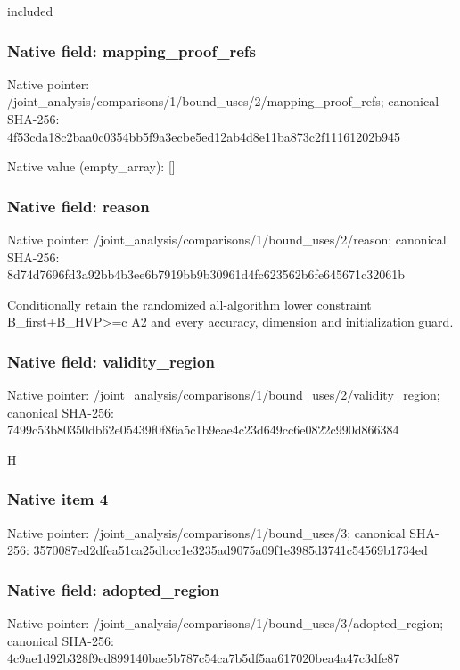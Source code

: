 \documentclass[10pt,a4paper]{article}
\begin{document}
\begingroup\raggedright\sloppy included\par\endgroup

\subsubsection{Native field: mapping\_\allowbreak{}proof\_\allowbreak{}refs}
Native pointer: /joint\_\allowbreak{}analysis/comparisons/1/bound\_\allowbreak{}uses/2/mapping\_\allowbreak{}proof\_\allowbreak{}refs; canonical SHA-256: 4f53cda18c2baa0c0354bb5f9a3ecbe5ed12ab4d8e11ba873c2f11161202b945

Native value (empty\_\allowbreak{}array): []

\subsubsection{Native field: reason}
Native pointer: /joint\_\allowbreak{}analysis/comparisons/1/bound\_\allowbreak{}uses/2/reason; canonical SHA-256: 8d74d7696fd3a92bb4b3ee6b7919bb9b30961d4fc623562b6fe645671c32061b

\begingroup\raggedright\sloppy Conditionally retain the randomized all-algorithm lower constraint B\_\allowbreak{}first+B\_\allowbreak{}HVP>=\allowbreak{}c A2 and every accuracy,\allowbreak{} dimension and initialization guard.\par\endgroup

\subsubsection{Native field: validity\_\allowbreak{}region}
Native pointer: /joint\_\allowbreak{}analysis/comparisons/1/bound\_\allowbreak{}uses/2/validity\_\allowbreak{}region; canonical SHA-256: 7499c53b80350db62e05439f0f86a5c1b9eae4c23d649cc6e0822c990d866384

\begingroup\raggedright\sloppy H\par\endgroup

\subsubsection{Native item 4}
Native pointer: /joint\_\allowbreak{}analysis/comparisons/1/bound\_\allowbreak{}uses/3; canonical SHA-256: 3570087ed2dfea51ca25dbcc1e3235ad9075a09f1e3985d3741c54569b1734ed

\subsubsection{Native field: adopted\_\allowbreak{}region}
Native pointer: /joint\_\allowbreak{}analysis/comparisons/1/bound\_\allowbreak{}uses/3/adopted\_\allowbreak{}region; canonical SHA-256: 4c9ae1d92b328f9ed899140bae5b787c54ca7b5df5aa617020bea4a47c3dfe87
\end{document}
